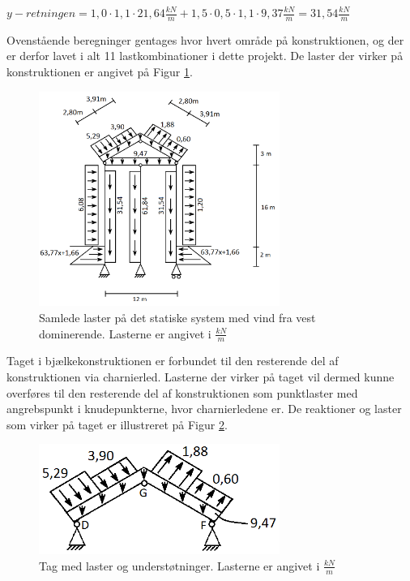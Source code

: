 \begin{center}
	$y-retningen = 1,\!0 \cdot 1,\!1 \cdot 21,\!64 \frac{kN}{m} + 1,\!5 \cdot 0,\!5 \cdot 1,\!1 \cdot 9,\!37 \frac{kN}{m} = 31,\!54 \frac{kN}{m}$ 
\end{center}

Ovenstående beregninger gentages hvor hvert område på konstruktionen, og der er derfor lavet i alt 11 lastkombinationer i dette projekt. De laster der virker på konstruktionen er angivet på Figur \ref{fig:laster}. 

\begin{figure}[htbp]
	\centering
	\includegraphics[width=0.7\textwidth]{billeder/vdom.png}
	\caption{Samlede laster på det statiske system med vind fra vest dominerende. Lasterne er angivet i $\frac{kN}{m}$}
	\label{fig:laster}
\end{figure}

Taget i bjælkekonstruktionen er forbundet til den resterende del af konstruktionen via charnierled. Lasterne der virker på taget vil dermed kunne overføres til den resterende del af konstruktionen som punktlaster med angrebspunkt i knudepunkterne, hvor charnierledene er. De reaktioner og laster som virker på taget er illustreret på Figur \ref{fig:tagmedreaktioner}.

\begin{figure}[htbp]
	\centering
	\includegraphics[width=0.7\textwidth]{billeder/tagmedreaktioner.png}
	\caption{Tag med laster og understøtninger. Lasterne er angivet i $\frac{kN}{m}$}
	\label{fig:tagmedreaktioner}
\end{figure}

